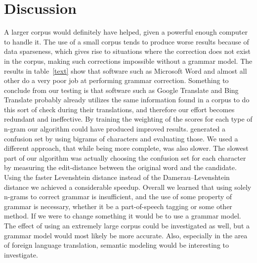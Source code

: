 \documentclass[twocolumn]{article}
\begin{document}
\section{Discussion}
A larger corpus would definitely have helped, given a powerful enough computer
to handle it. The use of a small corpus tends to produce worse results because
of data sparseness, which gives rise to situations where the correction does not
exist in the corpus, making such corrections impossible without a grammar model.
The results in table~\ref{text} show that software such as Microsoft Word and
almost all other do a very poor job at performing grammar correction.
Something to conclude from our testing is that software such as Google Translate
and Bing Translate probably already utilizes the same information found in a
corpus to do this sort of check during their translations, and therefore our
effort becomes redundant and ineffective.
By training the weighting of the scores for each type of n-gram our algorithm
could have produced improved results.
\cite{Bassil12} generated a confusion set by using bigrams of characters and
evaluating those. We used a different approach, that while being more complete,
was also slower. The slowest part of our algorithm was actually choosing the
confusion set for each character by measuring the edit-distance between the
original word and the candidate. Using the faster Levenshtein distance instead
of the Damerau–Levenshtein distance we achieved a considerable speedup. Overall
we learned that using solely n-grams to correct grammar is insufficient, and the
use of some property of grammar is necessary, whether it be a part-of-speech
tagging or some other method. If we were to change something it would be to use
a grammar model. The effect of using an extremely large corpus could be
investigated as well, but a grammar model would most likely be more accurate.
Also, especially in the area of foreign language translation, semantic modeling
would be interesting to investigate.

\small

\end{document}
